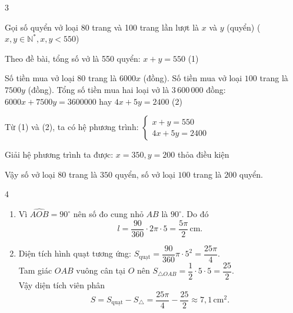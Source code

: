 \begin{Solbook}{3}
 \par \noindent  Gọi số quyển vở loại 80 trang và 100 trang lần lượt là $x$ và $y$ (quyển) ($x,y\in \mathbb {N}^*,x,y<550$) \par Theo đề bài, tổng số vở là 550 quyển: $x + y = 550$ \quad (1) \par Số tiền mua vở loại $80$ trang là $6000x$ (đồng). Số tiền mua vở loại $100$ trang là $7500y$ (đồng). Tổng số tiền mua hai loại vở là $3\,600\,000$ đồng: $6000x + 7500y = 3600000$ hay $4x + 5y = 2400$ \quad (2) \par Từ (1) và (2), ta có hệ phương trình: $\begin {cases} x + y = 550 \\ 4x + 5y = 2400 \end {cases}$ \par Giải hệ phương trình ta được: $x=350, y=200$ thỏa điều kiện \par Vậy số vở loại $80$ trang là $350$ quyển, số vở loại $100$ trang là $200$ quyển.  \hfill \qedEX 
\end{Solbook}
\begin{Solbook}{4}
 \par \noindent  \begin {enumerate} \item Vì $\widehat {AOB}=90^{\circ }$ nên số đo cung nhỏ $AB$ là $90^{\circ }$. Do đó \[ l=\dfrac {90}{360}\cdot 2\pi \cdot 5=\dfrac {5\pi }{2}\,\text {cm}. \] \item Diện tích hình quạt tương ứng: $S_{\text {quạt}}=\dfrac {90}{360}\pi \cdot 5^2=\dfrac {25\pi }{4}$. \\Tam giác $OAB$ vuông cân tại $O$ nên $S_{\triangle OAB}=\dfrac {1}{2}\cdot 5\cdot 5=\dfrac {25}{2}$. \\Vậy diện tích viên phân \[ S= S_{\text {quạt}}-S_{\triangle }=\dfrac {25\pi }{4}-\dfrac {25}{2}\approx 7{,}1\,\text {cm}^2. \] \end {enumerate}  \hfill \qedEX 
\end{Solbook}
